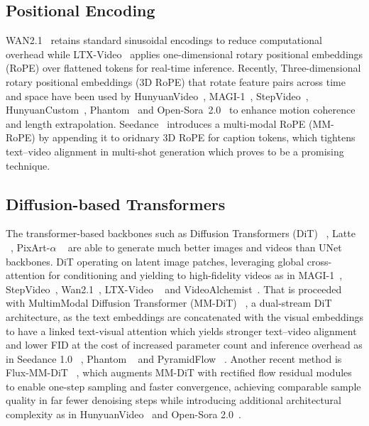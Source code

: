 \subsection{Positional Encoding}
WAN2.1~\cite{wan2025} retains standard sinusoidal encodings to reduce computational overhead while LTX-Video~\cite{hacohen2025ltxvideo} applies one-dimensional rotary positional embeddings (RoPE) over flattened tokens for real-time inference. Recently, Three-dimensional rotary positional embeddings (3D RoPE) that rotate feature pairs across time and space have been used by HunyuanVideo~\cite{kong2024hunyuanvideo}, MAGI-1~\cite{teng2025magi1}, StepVideo~\cite{huang2025stepvideo}, HunyuanCustom~\cite{hu2025hunyuancustom}, Phantom~\cite{liu2025phantom} and Open-Sora~2.0~\cite{peng2025opensora2} to enhance motion coherence and length extrapolation. Seedance~\cite{gao2025seedance} introduces a multi-modal RoPE (MM-RoPE) by appending it to oridnary 3D RoPE for caption tokens, which tightens text–video alignment in multi-shot generation which proves to be a promising technique.
\subsection{Diffusion-based Transformers}
The transformer-based backbones such as Diffusion Transformers (DiT) ~\cite{dit2023}, Latte ~\cite{latte2025}, PixArt-$\alpha$ ~\cite{pixart2023} are able to generate much better images and videos than UNet backbones. DiT operating on latent image patches, leveraging global cross-attention for conditioning and yielding to high-fidelity videos as in MAGI-1~\cite{teng2025magi1}, StepVideo~\cite{huang2025stepvideo}, Wan2.1~\cite{wan2025}, LTX-Video ~\cite{hacohen2025ltxvideo} and VideoAlchemist~\cite{chen2025videoalchemist}. That is proceeded with MultimModal Diffusion Transformer (MM-DiT) ~\cite{flowmatching2024}, a dual-stream DiT architecture, as the text embeddings are concatenated with the visual embeddings to have a linked text-visual attention which yields stronger text–video alignment and lower FID at the cost of increased parameter count and inference overhead as in Seedance 1.0 ~\cite{gao2025seedance}, Phantom ~\cite{liu2025phantom} and PyramidFlow ~\cite{jin2024pyramidflow}. Another recent method is Flux-MM-DiT ~\cite{fluxdit2024}, which augments MM-DiT with rectified flow residual modules to enable one-step sampling and faster convergence, achieving comparable sample quality in far fewer denoising steps while introducing additional architectural complexity as in HunyuanVideo~\cite{kong2024hunyuanvideo} and Open-Sora 2.0~\cite{peng2025opensora2}.

